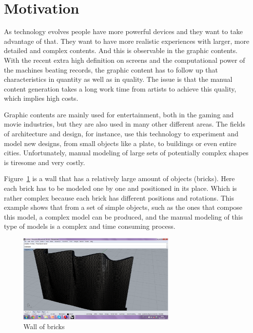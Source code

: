 
\section{Motivation} %
\label{sec:motivation}

As technology evolves people have more powerful devices and they want to take advantage of that. They want to have more realistic experiences with larger, more detailed and complex contents.
And this is observable in the graphic contents. With the recent extra high definition on screens and the computational power of the machines beating records, the graphic content has to follow up that characteristics in quantity as well as in quality. The issue is that the manual content generation takes a long work time from artists to achieve this quality, which implies high costs.

Graphic contents are mainly used for entertainment, both in the gaming and movie industries, but they are also used in many other different areas. The fields of architecture and design, for instance, use this technology to experiment and model new designs, from small objects like a plate, to buildings or even entire cities. Unfortunately, manual modeling of large sets of potentially complex shapes is tiresome and very costly. 

Figure~\ref{fig:brickwall} is a wall that has a relatively large amount of objects (bricks). Here each brick has to be modeled one by one and positioned in its place. Which is rather complex because each brick has different positions and rotations. This example shows that from a set of simple objects, such as the ones that compose this model, a complex model can be produced, and the manual modeling of this type of models is a complex and time consuming process.

\begin{figure}[htbp]
	\centering
	\includegraphics[width=0.7\textwidth, trim = 20mm 25mm 80mm 28mm, clip]{images/parede-sin.png}
	\caption{Wall of bricks}
	\label{fig:brickwall}
\end{figure}



